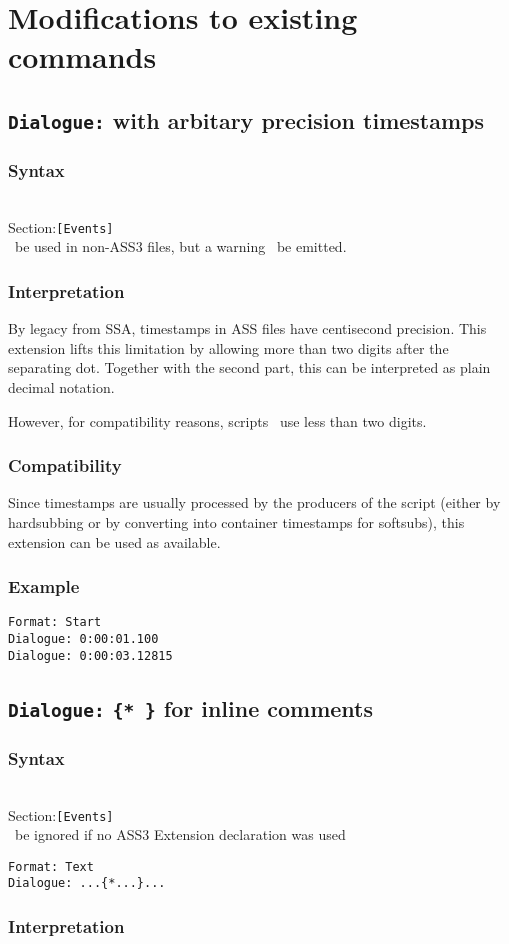 \documentclass{spec}
\newcommand{\syntax}[1]{
	\subsubsection*{Syntax}
	\begin{tabbing}
	\hspace{2cm}\=\\[-16pt]
	#1
	\end{tabbing}
}
\newcommand{\mustuse}{\must\ be ignored if no ASS3 Extension declaration was used}
\newcommand{\mayuse}{\may\ be used in non-ASS3 files, but a warning \should\ be emitted.}
\newcommand{\secspec}[1]{Section:\>\texttt{#1}}
\begin{document}
\section{Modifications to existing commands}
\subsection{\texttt{Dialogue:} with arbitary precision timestamps}
\syntax{
	\secspec{[Events]}\\
	\mayuse
}

\subsubsection*{Interpretation}
By legacy from SSA, timestamps in ASS files have centisecond precision.
This extension lifts this limitation by allowing more than two digits
after the separating dot. Together with the second part, this can be
interpreted as plain decimal notation.

However, for compatibility reasons, scripts \mustnot\ use less than two
digits.

\subsubsection*{Compatibility}
Since timestamps are usually processed by the producers of the script
(either by hardsubbing or by converting into container timestamps for
softsubs), this extension can be used as available.
 
\subsubsection*{Example}
\begin{verbatim}
Format: Start
Dialogue: 0:00:01.100
Dialogue: 0:00:03.12815
\end{verbatim}

\subsection{\texttt{Dialogue:} \texttt{\{* \}} for inline comments}
\syntax{
	\secspec{[Events]}\\
	\mustuse
}
\begin{verbatim}
Format: Text
Dialogue: ...{*...}...
\end{verbatim}

\subsubsection*{Interpretation}
\end{document}
